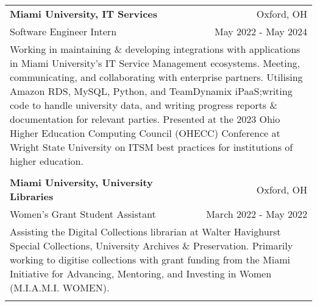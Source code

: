 \documentclass[letterpaper,8pt]{article} %
\begin{document}
{\begin{tabular*}{\linewidth}{@{\extracolsep{\fill}} lr }

\textbf{Miami University, IT Services} & \footnotesize{Oxford, OH}\\
\footnotesize{Software Engineer Intern} & \footnotesize{May 2022 - May 2024}\\
\multicolumn{2}{p{\linewidth}}{\footnotesize{Working in maintaining \& developing integrations with applications in Miami University's IT Service Management ecosystems. Meeting, communicating, and collaborating with enterprise partners. Utilising Amazon RDS, MySQL, Python, and TeamDynamix iPaaS;\@ writing code to handle university data, and writing progress reports \& documentation for relevant parties. Presented at the 2023 Ohio Higher Education Computing Council (OHECC) Conference at Wright State University on ITSM best practices for institutions of higher education.}}\\
\multicolumn{2}{c}{} \\


\textbf{Miami University, University Libraries} & \footnotesize{Oxford, OH}\\
\footnotesize{Women's Grant Student Assistant} & \footnotesize{March 2022 - May 2022}\\
\multicolumn{2}{p{\linewidth}}{\footnotesize{Assisting the Digital Collections librarian at Walter Havighurst Special Collections, University Archives \& Preservation. Primarily working to digitise collections with grant funding from the Miami Initiative for Advancing, Mentoring, and Investing in Women (M.I.A.M.I. WOMEN).}}\\
\multicolumn{2}{c}{} \\



\end{tabular*}}
\end{document}
